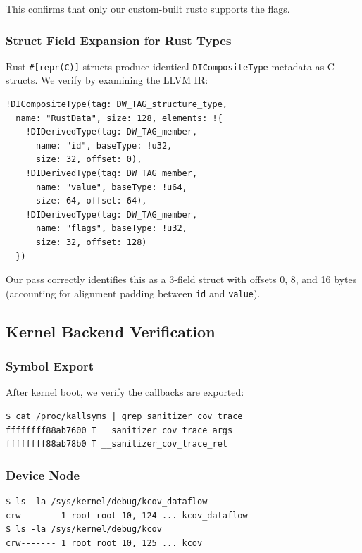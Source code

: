 \documentclass{ndss}
\begin{document}
This confirms that only our custom-built rustc supports the flags.

\subsubsection{Struct Field Expansion for Rust Types}

Rust \texttt{\#[repr(C)]} structs produce identical \texttt{DICompositeType}
metadata as C structs. We verify by examining the LLVM IR:
\begin{lstlisting}[numbers=none]
!DICompositeType(tag: DW_TAG_structure_type,
  name: "RustData", size: 128, elements: !{
    !DIDerivedType(tag: DW_TAG_member,
      name: "id", baseType: !u32,
      size: 32, offset: 0),
    !DIDerivedType(tag: DW_TAG_member,
      name: "value", baseType: !u64,
      size: 64, offset: 64),
    !DIDerivedType(tag: DW_TAG_member,
      name: "flags", baseType: !u32,
      size: 32, offset: 128)
  })
\end{lstlisting}

Our pass correctly identifies this as a 3-field struct with offsets 0, 8, and
16 bytes (accounting for alignment padding between \texttt{id} and
\texttt{value}).

\subsection{Kernel Backend Verification}

\subsubsection{Symbol Export}

After kernel boot, we verify the callbacks are exported:
\begin{lstlisting}[numbers=none]
$ cat /proc/kallsyms | grep sanitizer_cov_trace
ffffffff88ab7600 T __sanitizer_cov_trace_args
ffffffff88ab78b0 T __sanitizer_cov_trace_ret
\end{lstlisting}

\subsubsection{Device Node}

\begin{lstlisting}[numbers=none]
$ ls -la /sys/kernel/debug/kcov_dataflow
crw------- 1 root root 10, 124 ... kcov_dataflow
$ ls -la /sys/kernel/debug/kcov
crw------- 1 root root 10, 125 ... kcov
\end{lstlisting}
\end{document}

